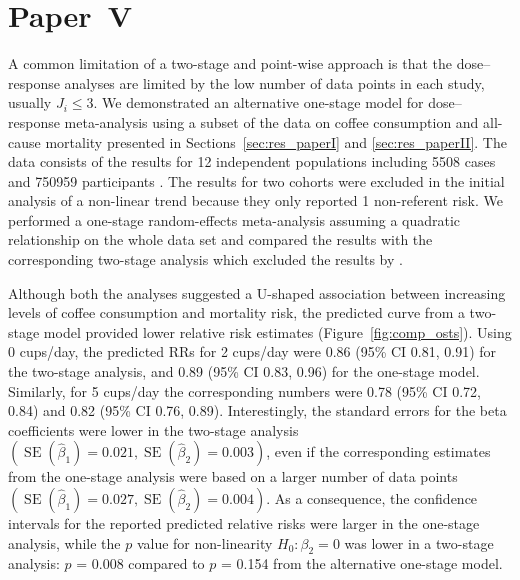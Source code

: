 \documentclass[11pt,a4paper,twoside,openany]{book}\usepackage{knitr}
\DeclareMathOperator{\SE}{SE}
\begin{document}
{{\section{Paper~V}



A common limitation of a two-stage and point-wise approach is that the dose--response analyses are limited by the low number of data points in each study, usually $J_i \le 3$. We demonstrated an alternative one-stage model for dose--response meta-analysis using a subset of the data on coffee consumption and all-cause mortality presented in Sections~\ref{sec:res_paperI} and \ref{sec:res_paperII}. The data consists of the results for 12 independent populations including 5508 cases and 750959 participants \citep{crippa2014coffee}. The results for two cohorts \citep{nilsson2012traditional} were excluded in the initial analysis of a non-linear trend because they only reported 1 non-referent risk. We performed a one-stage random-effects meta-analysis assuming a quadratic relationship on the whole data set and compared the results with the corresponding two-stage analysis which excluded the results by \cite{nilsson2012traditional}. 

\noindent Although both the analyses suggested a U-shaped association between increasing levels of coffee consumption and mortality risk, the predicted curve from a two-stage model provided lower relative risk estimates (Figure~\ref{fig:comp_osts}). Using 0 cups/day, the predicted RRs for 2 cups/day were 0.86 (95\% CI 0.81, 0.91) for the two-stage analysis, and 0.89 (95\% CI 0.83, 0.96) for the one-stage model. Similarly, for 5 cups/day the corresponding numbers were 0.78 (95\% CI 0.72, 0.84) and 0.82 (95\% CI 0.76, 0.89). Interestingly, the standard errors for the beta coefficients were lower in the two-stage analysis $\left( \SE \left(\hat \beta_1 \right) = 0.021, \SE \left(\hat \beta_2 \right) = 0.003 \right)$, even if the corresponding estimates from the one-stage analysis were based on a larger number of data points $\left( \SE \left(\hat \beta_1 \right) = 0.027, \SE \left(\hat \beta_2 \right) = 0.004\right)$. As a consequence, the confidence intervals for the reported predicted relative risks were larger in the one-stage analysis, while the $p$ value for non-linearity $H_0: \beta_2 = 0$ was lower in a two-stage analysis: $p$ = 0.008 compared to $p$ = 0.154 from the alternative one-stage model.

\begin{knitrout}\footnotesize
{}\color{fgcolor}\begin{figure}[ht!]


\end{figure}
\end{knitrout}}}
\end{document}
